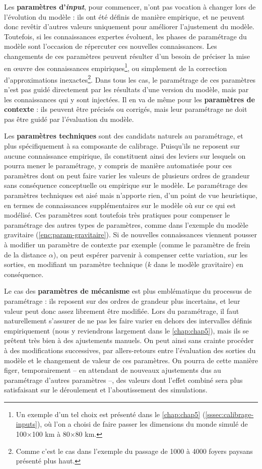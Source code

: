 Les \textbf{paramètres d'\textit{input}}, pour commencer, n'ont pas vocation à changer lors de l'évolution du modèle : ils ont été définis de manière empirique, et ne peuvent donc revêtir d'autres valeurs uniquement pour améliorer l'ajustement du modèle.
Toutefois, si les connaissances expertes évoluent, les phases de paramétrage du modèle sont l'occasion de répercuter ces nouvelles connaissances.
Les changements de ces paramètres peuvent résulter d'un besoin de préciser la mise en œuvre des connaissances empiriques\footnote{
	Un exemple d'un tel choix est présenté dans le \cref{chap:chap5} (\cref{sssec:calibrage-inputs}), où l'on a choisi de faire passer les dimensions du monde simulé de 100×100 km à 80×80 km.
}, ou simplement de la correction d'approximations inexactes\footnote{
	Comme c'est le cas dans l'exemple du passage de 1000 à 4000 foyers paysans présenté plus haut.
}.
Dans tous les cas, le paramétrage de ces paramètres n'est pas guidé directement par les résultats d'une version du modèle, mais par les connaissances qui y sont injectées.
Il en va de même pour les \textbf{paramètres de contexte} : ils peuvent être précisés ou corrigés, mais leur paramétrage ne doit pas être guidé par l'évaluation du modèle.

Les \textbf{paramètres techniques} sont des candidats naturels au paramétrage, et plus spécifiquement à sa composante de calibrage.
Puisqu'ils ne reposent sur aucune connaissance empirique, ils constituent ainsi des \og leviers\fg{} sur lesquels on pourra mener le paramétrage, y compris de manière automatisée pour ces paramètres dont on peut faire varier les valeurs de plusieurs ordres de grandeur sans conséquence conceptuelle ou empirique sur le modèle.
Le paramétrage des paramètres techniques est aisé mais n'apporte rien, d'un point de vue heuristique, en termes de connaissances supplémentaires sur le modèle où sur ce qui est modélisé.
Ces paramètres sont toutefois très \og pratiques\fg{} pour compenser le paramétrage des autres types de paramètres, comme dans l'exemple du modèle gravitaire (\cref{enc:param-gravitaire}).
Si de nouvelles connaissances viennent pousser à modifier un paramètre de contexte par exemple (comme le paramètre de frein de la distance $\alpha$), on peut espérer parvenir à compenser cette variation, sur les sorties, en modifiant un paramètre technique ($k$ dans le modèle gravitaire) en conséquence.

Le cas des \textbf{paramètres de mécanisme} est plus emblématique du processus de paramétrage : ils reposent sur des ordres de grandeur plus incertains, et leur valeur peut donc assez librement être modifiée.
Lors du paramétrage, il faut naturellement s'assurer de ne pas les faire varier en dehors des intervalles définis empiriquement (nous y reviendrons largement dans le \cref{chap:chap5}), mais ils se prêtent très bien à des ajustements manuels.
On peut ainsi sans crainte procéder à des modifications successives, par allers-retours entre l'évaluation des sorties du modèle et le changement de valeur de ces paramètres.
On pourra de cette manière figer, temporairement -- en attendant de nouveaux ajustements dus au paramétrage d'autres paramètres --, des valeurs dont l'effet combiné sera plus satisfaisant sur le déroulement et l'aboutissement des simulations.

